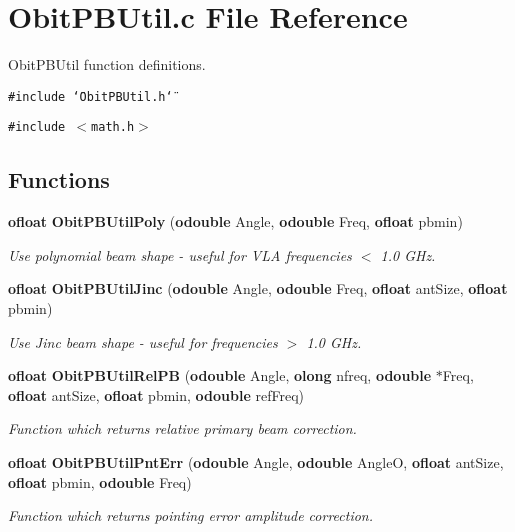 \section{Obit\-PBUtil.c File Reference}
\label{ObitPBUtil_8c}
Obit\-PBUtil function definitions. 

{\tt \#include \char`\"{}Obit\-PBUtil.h\char`\"{}}\par
{\tt \#include $<$math.h$>$}\par
\subsection*{Functions}
\begin{CompactItemize}
\item 
{\bf ofloat} {\bf Obit\-PBUtil\-Poly} ({\bf odouble} Angle, {\bf odouble} Freq, {\bf ofloat} pbmin)
\begin{CompactList}\small\item\em Use polynomial beam shape - useful for VLA frequencies $<$ 1.0 GHz. \item\end{CompactList}\item 
{\bf ofloat} {\bf Obit\-PBUtil\-Jinc} ({\bf odouble} Angle, {\bf odouble} Freq, {\bf ofloat} ant\-Size, {\bf ofloat} pbmin)
\begin{CompactList}\small\item\em Use Jinc beam shape - useful for frequencies $>$ 1.0 GHz. \item\end{CompactList}\item 
{\bf ofloat} {\bf Obit\-PBUtil\-Rel\-PB} ({\bf odouble} Angle, {\bf olong} nfreq, {\bf odouble} $\ast$Freq, {\bf ofloat} ant\-Size, {\bf ofloat} pbmin, {\bf odouble} ref\-Freq)
\begin{CompactList}\small\item\em Function which returns relative primary beam correction. \item\end{CompactList}\item 
{\bf ofloat} {\bf Obit\-PBUtil\-Pnt\-Err} ({\bf odouble} Angle, {\bf odouble} Angle\-O, {\bf ofloat} ant\-Size, {\bf ofloat} pbmin, {\bf odouble} Freq)
\begin{CompactList}\small\item\em Function which returns pointing error amplitude correction. \item\end{CompactList}\item 

\end{CompactItemize}
